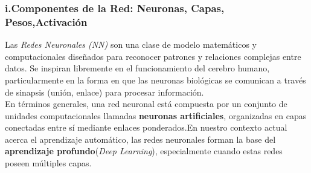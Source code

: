\documentclass[11pt]{article} %
\begin{document}
\subsubsection*{i.Componentes de la Red: Neuronas, Capas, Pesos,Activación} 
\vspace{3pt}
Las \textit{Redes Neuronales (NN)} son una clase de modelo matemáticos y computacionales diseñados para reconocer patrones y relaciones complejas entre datos. Se inspiran libremente en el funcionamiento del cerebro humano, particularmente en la forma en que las neuronas biológicas se comunican a través de sinapsis (unión, enlace) para procesar información.\\
En términos generales, una red neuronal está compuesta por un conjunto de unidades computacionales llamadas \textbf{neuronas artificiales}, organizadas en capas conectadas entre sí mediante enlaces ponderados.En nuestro contexto actual acerca el aprendizaje automático, las redes neuronales forman la base del \textbf{aprendizaje profundo}(\textit{Deep Learning}), especialmente cuando estas redes poseen múltiples capas.
\end{document}
